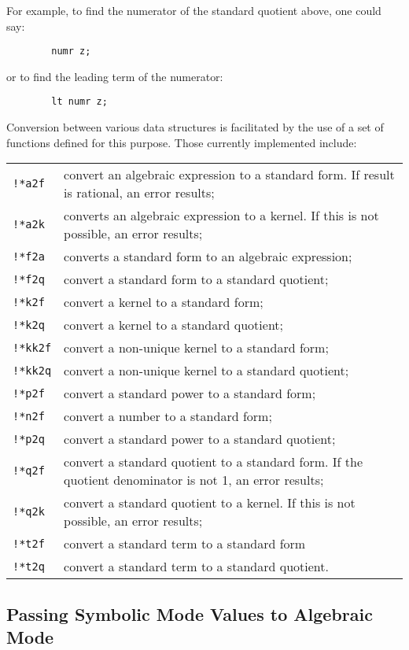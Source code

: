 For example, to find the numerator of the standard quotient above, one
could say:
\begin{verbatim}
        numr z;
\end{verbatim}
or to find the leading term of the numerator:
\begin{verbatim}
        lt numr z;
\end{verbatim}
Conversion between various data structures is facilitated by the use of a
set of functions defined for this purpose. Those currently implemented
include:

{\renewcommand{\arraystretch}{1.5}
\begin{tabular}{lp{\reduceboxwidth}}
\texttt{!*a2f} & convert an algebraic expression to
a standard form.  If result is rational, an error results; \\
%
\texttt{!*a2k} & converts an algebraic expression to
a kernel.  If this is not possible, an error results; \\
%
\texttt{!*f2a} & converts a standard form to an
algebraic expression; \\
%
\texttt{!*f2q} & convert a standard form to a
standard quotient; \\
%
\texttt{!*k2f} & convert a kernel to a standard form; \\
\texttt{!*k2q} & convert a kernel to a standard quotient; \\
%
\texttt{!*kk2f} & convert a non-unique kernel to a standard form; \\
\texttt{!*kk2q} & convert a non-unique kernel to a standard quotient; \\
%
\texttt{!*p2f} & convert a standard power to a
standard form; \\
%
\texttt{!*n2f} & convert a number to a
standard form; \\
%
\texttt{!*p2q} & convert a standard power to a standard quotient; \\
%
\texttt{!*q2f} & convert a standard quotient to a
standard form.  If the quotient denominator is not 1, an error results; \\
%
\texttt{!*q2k} & convert a standard quotient to a
kernel.  If this is not possible, an error results; \\
%
\texttt{!*t2f} & convert a standard term to a standard form \\
%
\texttt{!*t2q} & convert a standard term to a standard quotient.
\end{tabular}}

\subsection{Passing Symbolic Mode Values to Algebraic Mode}

